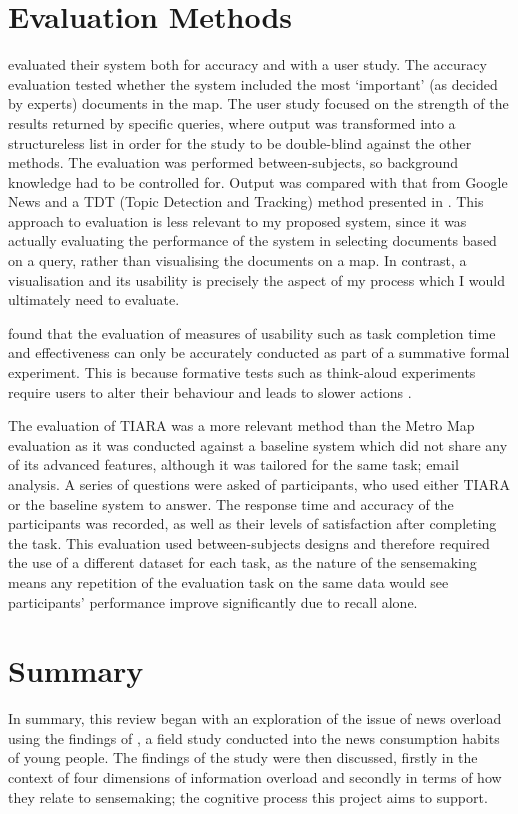 \section{Evaluation Methods}
\citet{GeneratingInformationMaps} evaluated their system both for accuracy and with a user study. The accuracy evaluation tested whether the system included the most `important' (as decided by experts) documents in the map. The user study focused on the strength of the results returned by specific queries, where output was transformed into a structureless list in order for the study to be double-blind against the other methods. The evaluation was performed between-subjects, so background knowledge had to be controlled for. Output was compared with that from Google News and a TDT (Topic Detection and Tracking) method presented in \citep{SemanticLanguageModelsForTDT}. This approach to evaluation is less relevant to my proposed system, since it was actually evaluating the performance of the system in selecting documents based on a query, rather than visualising the documents on a map. In contrast, a visualisation and its usability is precisely the aspect of my process which I would ultimately need to evaluate.

\citet{EvaluatingInformationVisualisations} found that the evaluation of measures of usability such as task completion time and effectiveness can only be accurately conducted as part of a summative formal experiment. This is because formative tests such as think-aloud experiments require users to alter their behaviour and leads to slower actions \citep{VerbalReportsAsData}.

The evaluation of TIARA \citep{InteractiveTopicBasedVisualTextSummarizationAndAnalysis} was a more relevant method than the Metro Map evaluation as it was conducted against a baseline system which did not share any of its advanced features, although it was tailored for the same task; email analysis. A series of questions were asked of participants, who used either TIARA or the baseline system to answer. The response time and accuracy of the participants was recorded, as well as their levels of satisfaction after completing the task. This evaluation used between-subjects designs and therefore required the use of a different dataset for each task, as the nature of the sensemaking means any repetition of the evaluation task on the same data would see participants' performance improve significantly due to recall alone.

\section{Summary}
In summary, this review began with an exploration of the issue of news overload using the findings of \citep{anewmodelfornews}, a field study conducted into the news consumption habits of young people. The findings of the study were then discussed, firstly in the context of four dimensions of information overload \citep{TowardsAnOptimalResolutionToInformationOverload, GuestEditorsIntroductionInformationOverload} and secondly in terms of how they relate to sensemaking; the cognitive process this project aims to support.

